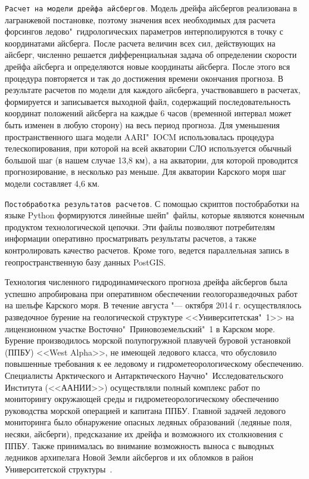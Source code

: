 \verb|Расчет на модели дрейфа айсбергов|. Модель дрейфа айсбергов реализована в лагранжевой постановке, поэтому значения всех необходимых для расчета форсингов ледово"~гидрологических параметров интерполируются в точку с координатами айсберга. После расчета величин всех сил, действующих на айсберг, численно решается дифференциальная задача об определении скорости дрейфа айсберга и определяются новые координаты айсберга. После этого вся процедура повторяется и так до достижения времени окончания прогноза. В результате расчетов по модели для каждого айсберга, участвовавшего в расчетах, формируется и записывается выходной файл, содержащий последовательность координат положений айсберга на каждые 6 часов (временной интервал может быть изменен в любую сторону) на весь период прогноза. Для уменьшения пространственного шага модели AARI"~IOCM использовалась процедура телескопирования, при которой на всей акватории СЛО используется обычный большой шаг (в нашем случае 13,8 км), а на акватории, для которой проводится прогнозирование, в несколько раз меньше. Для акватории Карского моря шаг модели составляет 4,6 км.

\verb|Постобработка результатов расчетов|. С помощью скриптов постобработки
на языке Python формируются линейные шейп"~файлы, которые являются конечным 
продуктом технологической цепочки. Эти файлы позволяют потребителям информации оперативно просматривать результаты расчетов, а также контролировать качество расчетов. Кроме того, ведется параллельная запись в геопространственную базу данных PostGIS.

Технология численного гидродинамического прогноза дрейфа айсбергов была успешно апробирована при оперативном обеспечении геологоразведочных работ на шельфе Карского моря. В течение августа "--- октября 2014 г. осуществлялось разведочное бурение на геологической структуре <<Университетская"~1>> на лицензионном участке Восточно"~Приновоземельский"~1 в Карском море. Бурение производилось морской полупогружной плавучей буровой установкой (ППБУ) <<West Alpha>>, не имеющей ледового класса, что обусловило повышенные требования к ее ледовому и гидрометеорологическому обеспечению. Специалисты Арктического и Антарктического Научно"~Исследовательского Института (<<ААНИИ>>) осуществляли полный комплекс работ по мониторингу окружающей среды и гидрометеорологическому обеспечению руководства морской операцией и капитана ППБУ. Главной задачей ледового мониторинга было обнаружение опасных ледяных образований (ледяные поля, несяки, айсберги), предсказание их дрейфа и возможного их столкновения с ППБУ. Также принималась во внимание возможность выноса с выводных ледников архипелага Новой Земли айсбергов и их обломков в район Университетской структуры~\cite{Mironov_Smirnov_Iceberg_2015}.

